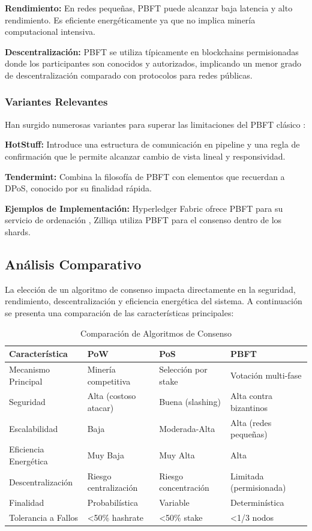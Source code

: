 \documentclass[spanish,12pt,letterpaper]{report}
\begin{document}
\textbf{Rendimiento:} En redes pequeñas, PBFT puede alcanzar baja latencia y alto rendimiento. Es eficiente energéticamente ya que no implica minería computacional intensiva.

\textbf{Descentralización:} PBFT se utiliza típicamente en blockchains permisionadas donde los participantes son conocidos y autorizados, implicando un menor grado de descentralización comparado con protocolos para redes públicas.

\subsubsection{Variantes Relevantes}

Han surgido numerosas variantes para superar las limitaciones del PBFT clásico \parencite{mdpi2025pbft}:

\textbf{HotStuff:} Introduce una estructura de comunicación en pipeline y una regla de confirmación que le permite alcanzar cambio de vista lineal y responsividad.

\textbf{Tendermint:} Combina la filosofía de PBFT con elementos que recuerdan a DPoS, conocido por su finalidad rápida.

\textbf{Ejemplos de Implementación:} Hyperledger Fabric ofrece PBFT para su servicio de ordenación \parencite{hyperledger2025fabric}, Zilliqa utiliza PBFT para el consenso dentro de los shards.

\subsection{Análisis Comparativo}

La elección de un algoritmo de consenso impacta directamente en la seguridad, rendimiento, descentralización y eficiencia energética del sistema. A continuación se presenta una comparación de las características principales:

\begin{table}[h]
\centering
\caption{Comparación de Algoritmos de Consenso}
\begin{tabular}{|l|p{3cm}|p{3cm}|p{3cm}|}
\hline
\textbf{Característica} & \textbf{PoW} & \textbf{PoS} & \textbf{PBFT} \\
\hline
Mecanismo Principal & Minería competitiva & Selección por stake & Votación multi-fase \\
\hline
Seguridad & Alta (costoso atacar) & Buena (slashing) & Alta contra bizantinos \\
\hline
Escalabilidad & Baja & Moderada-Alta & Alta (redes pequeñas) \\
\hline
Eficiencia Energética & Muy Baja & Muy Alta & Alta \\
\hline
Descentralización & Riesgo centralización & Riesgo concentración & Limitada (permisionada) \\
\hline
Finalidad & Probabilística & Variable & Determinística \\
\hline
Tolerancia a Fallos & <50\% hashrate & <50\% stake & <1/3 nodos \\
\hline
\end{tabular}
\end{table}
\end{document}
